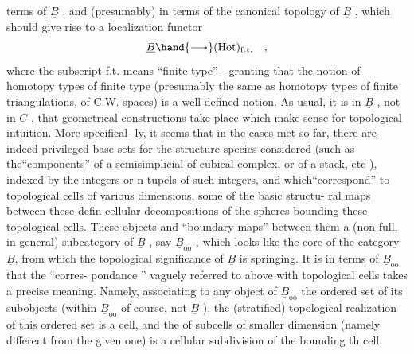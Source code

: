 
terms of $\underline{B}$ , and (presumably) in terms of the canonical topology of $\underline{B}$ ,
which should give rise to a localization functor
\[ \underline{B} \hand{\longrightarrow} (\mathrm{Hot})_{\mathrm{f.t.}} \quad , \]
where the subscript f.t. means ``finite type'' - granting that the notion
of homotopy types of finite type (presumably the same as homotopy types
of finite triangulations, of C.W. spaces) is a well defined notion.
As usual, it is in $\underline{B}$ , not in $\underline{C}$ , that geometrical constructions
take place which make sense for topological intuition. More specifical-%
ly, it seems that in the cases met so far, there \uline{are} indeed privileged
base-sets for the structure species considered (such as the``components''
of a semisimplicial of cubical complex, or of a stack, etc ), indexed
by the integers or n-tupels of such integers, and which``correspond'' to
topological cells of various dimensions,  some of the basic structu-%
ral maps between these defin cellular decompositions of the spheres
bounding these topological cells. These objects and ``boundary\hand{*} maps''
between them  a (non full, in general) subcategory of $\underline{B}$ , say $\underline{B}_{\mathrm{oo}}$ ,
which looks like the core of the category $\underline{B}$, from which the topological
significance of $\underline{B}$ is springing. It is in terms of $\underline{B}_{\mathrm{oo}}$ that the ``corres-%
pondance '' \hand{(}vaguely referred to above\hand{)} with topological cells takes a
precise meaning. Namely, associating to any object of $\underline{B}_{\mathrm{oo}}$ the ordered
set of its subobjects (within $\underline{B}_{\mathrm{oo}}$ of course, not $\underline{B}$ ), the 
(stratified) topological realization of this ordered set is a cell, and
the  of  subcells of smaller dimension (namely different from
the given one) is a cellular subdivision of the bounding th cell.

